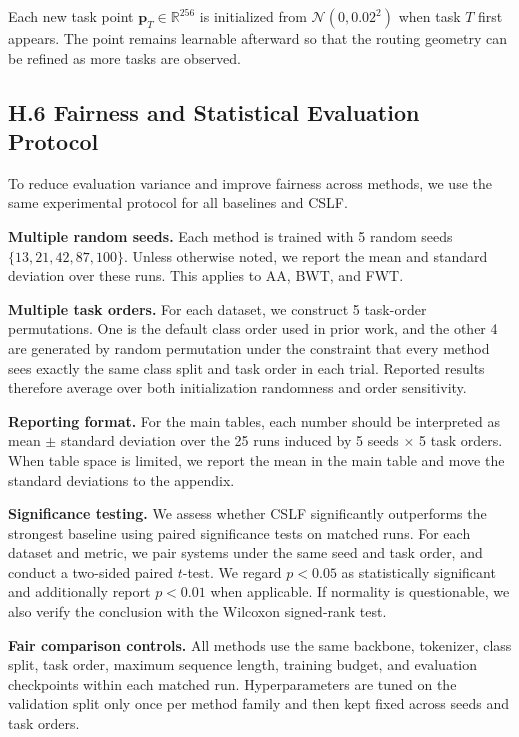 \documentclass[11pt]{article}
\begin{document}
Each new task point $\mathbf{p}_T \in \mathbb{R}^{256}$ is initialized from $\mathcal{N}(0, 0.02^2)$ when task $T$ first appears. The point remains learnable afterward so that the routing geometry can be refined as more tasks are observed.

\subsection*{H.6 Fairness and Statistical Evaluation Protocol}

To reduce evaluation variance and improve fairness across methods, we use the same experimental protocol for all baselines and CSLF.

\textbf{Multiple random seeds.}
Each method is trained with 5 random seeds $\{13, 21, 42, 87, 100\}$. Unless otherwise noted, we report the mean and standard deviation over these runs. This applies to AA, BWT, and FWT.

\textbf{Multiple task orders.}
For each dataset, we construct 5 task-order permutations. One is the default class order used in prior work, and the other 4 are generated by random permutation under the constraint that every method sees exactly the same class split and task order in each trial. Reported results therefore average over both initialization randomness and order sensitivity.

\textbf{Reporting format.}
For the main tables, each number should be interpreted as mean $\pm$ standard deviation over the 25 runs induced by 5 seeds $\times$ 5 task orders. When table space is limited, we report the mean in the main table and move the standard deviations to the appendix.

\textbf{Significance testing.}
We assess whether CSLF significantly outperforms the strongest baseline using paired significance tests on matched runs. For each dataset and metric, we pair systems under the same seed and task order, and conduct a two-sided paired $t$-test. We regard $p < 0.05$ as statistically significant and additionally report $p < 0.01$ when applicable. If normality is questionable, we also verify the conclusion with the Wilcoxon signed-rank test.

\textbf{Fair comparison controls.}
All methods use the same backbone, tokenizer, class split, task order, maximum sequence length, training budget, and evaluation checkpoints within each matched run. Hyperparameters are tuned on the validation split only once per method family and then kept fixed across seeds and task orders.
\end{document}
